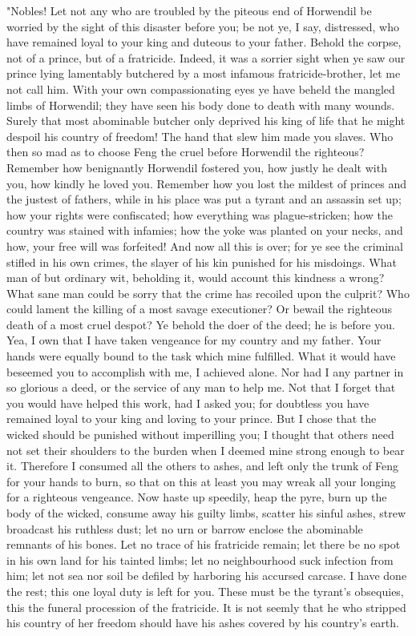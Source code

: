 \documentclass[10pt,a4paper]{report}
\begin{document}
"Nobles! Let not any who are troubled by the piteous end of Horwendil be worried by the sight of this disaster before you; be not ye, I say, distressed, who have remained loyal to your king and duteous to your father. Behold the corpse, not of a prince, but of a fratricide. Indeed, it was a sorrier sight when ye saw our prince lying lamentably butchered by a most infamous fratricide-brother, let me not call him. With your own compassionating eyes ye have beheld the mangled limbs of Horwendil; they have seen his body done to death with many wounds. Surely that most abominable butcher only deprived his king of life that he might despoil his country of freedom! The hand that slew him made you slaves. Who then so mad as to choose Feng the cruel before Horwendil the righteous? Remember how benignantly Horwendil fostered you, how justly he dealt with you, how kindly he loved you. Remember how you lost the mildest of princes and the justest of fathers, while in his place was put a tyrant and an assassin set up; how your rights were confiscated; how everything was plague-stricken; how the country was stained with infamies; how the yoke was planted on your necks, and how, your free will was forfeited! And now all this is over; for ye see the criminal stifled in his own crimes, the slayer of his kin punished for his misdoings. What man of but ordinary wit, beholding it, would account this kindness a wrong? What sane man could be sorry that the crime has recoiled upon the culprit? Who could lament the killing of a most savage executioner? Or bewail the righteous death of a most cruel despot? Ye behold the doer of the deed; he is before you. Yea, I own that I have taken vengeance for my country and my father. Your hands were equally bound to the task which mine fulfilled. What it would have beseemed you to accomplish with me, I achieved alone. Nor had I any partner in so glorious a deed, or the service of any man to help me. Not that I forget that you would have helped this work, had I asked you; for doubtless you have remained loyal to your king and loving to your prince. But I chose that the wicked should be punished without imperilling you; I thought that others need not set their shoulders to the burden when I deemed mine strong enough to bear it. Therefore I consumed all the others to ashes, and left only the trunk of Feng for your hands to burn, so that on this at least you may wreak all your longing for a righteous vengeance. Now haste up speedily, heap the pyre, burn up the body of the wicked, consume away his guilty limbs, scatter his sinful ashes, strew broadcast his ruthless dust; let no urn or barrow enclose the abominable remnants of his bones. Let no trace of his fratricide remain; let there be no spot in his own land for his tainted limbs; let no neighbourhood suck infection from him; let not sea nor soil be defiled by harboring his accursed carcase. I have done the rest; this one loyal duty is left for you. These must be the tyrant's obsequies, this the funeral procession of the fratricide. It is not seemly that he who stripped his country of her freedom should have his ashes covered by his country's earth.\\
\end{document}

